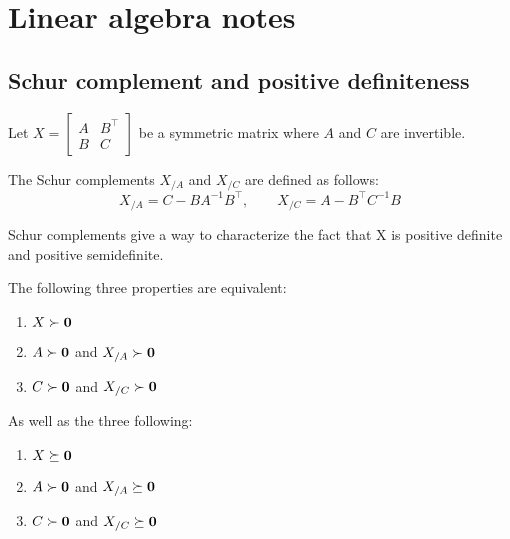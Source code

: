 \chapter{Linear algebra notes}\label{ch:linear_algebra}

\section{Schur complement and positive definiteness}\label{sec:schur_complement}

Let $X = \begin{bmatrix}
             A & B^\top\\
             B & C
    \end{bmatrix}$
be a symmetric matrix where $A$ and $C$ are invertible.
\begin{definition}
    The Schur complements $X_{/A}$ and $X_{/C}$ are defined as follows:
    \begin{equation*}
        X_{/A} = C - B A^{-1} B^\top
        ,\qquad
        X_{/C} = A - B^\top C^{-1} B
    \end{equation*}
\end{definition}
Schur complements give a way to characterize the fact that X is positive definite and positive semidefinite.
\begin{theorem}
    The following three properties are equivalent:
    \begin{enumerate}
        \item $X \succ \mathbf{0}$
        \item $A \succ \mathbf{0}$ and $X_{/A} \succ \mathbf{0}$
        \item $C \succ \mathbf{0}$ and $X_{/C} \succ \mathbf{0}$
    \end{enumerate}
    As well as the three following:
    \begin{enumerate}
        \item $X \succeq \mathbf{0}$
        \item $A \succ \mathbf{0}$ and $X_{/A} \succeq \mathbf{0}$
        \item $C \succ \mathbf{0}$ and $X_{/C} \succeq \mathbf{0}$
    \end{enumerate}
\end{theorem}

